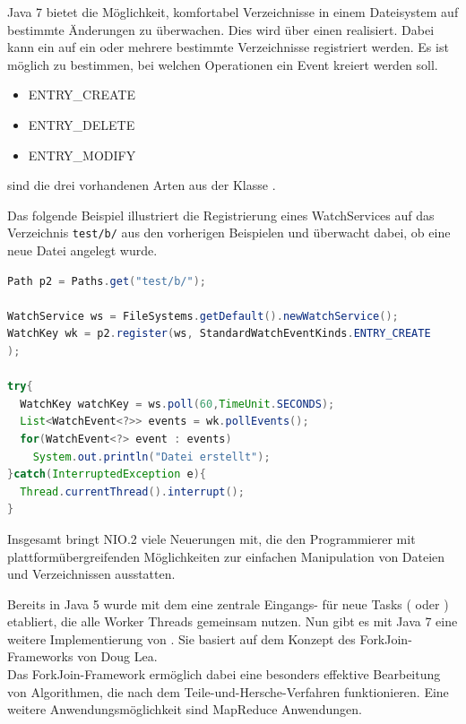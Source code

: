 \documentclass[times, 10pt,twocolumn]{article}
\begin{document}
Java 7 bietet die Möglichkeit, komfortabel Verzeichnisse in einem Dateisystem auf bestimmte Änderungen zu überwachen.
Dies wird über einen  realisiert. Dabei kann ein  auf ein oder mehrere bestimmte Verzeichnisse registriert werden. Es ist möglich zu bestimmen, bei welchen Operationen ein Event kreiert werden soll.
\begin{itemize}
  \item ENTRY\_CREATE
  \item ENTRY\_DELETE
  \item ENTRY\_MODIFY
\end{itemize}
sind die drei vorhandenen Arten aus der Klasse .

Das folgende Beispiel illustriert die Registrierung eines WatchServices auf das Verzeichnis \texttt{test/b/} aus den vorherigen
Beispielen und überwacht dabei, ob eine neue Datei angelegt wurde.
\begin{lstlisting}[language=java,breaklines=true]
Path p2 = Paths.get("test/b/");

WatchService ws = FileSystems.getDefault().newWatchService();
WatchKey wk = p2.register(ws, StandardWatchEventKinds.ENTRY_CREATE
);

try{
  WatchKey watchKey = ws.poll(60,TimeUnit.SECONDS);
  List<WatchEvent<?>> events = wk.pollEvents();
  for(WatchEvent<?> event : events)
    System.out.println("Datei erstellt");
}catch(InterruptedException e){
  Thread.currentThread().interrupt();
}
\end{lstlisting}

Insgesamt bringt NIO.2 viele Neuerungen mit, die den Programmierer mit plattformübergreifenden Möglichkeiten zur einfachen
Manipulation von Dateien und Verzeichnissen ausstatten. 

Bereits in Java 5 wurde mit dem  eine zentrale Eingangs- für neue Tasks ( oder ) etabliert, die alle Worker Threads gemeinsam nutzen. Nun gibt es mit Java 7 eine weitere Implementierung von . Sie basiert auf dem Konzept des ForkJoin-Frameworks\cite{forkjoinpaper} von Doug Lea.\cite{forkjoinheise}\\

Das ForkJoin-Framework ermöglich dabei eine besonders effektive Bearbeitung von Algorithmen, die nach dem Teile-und-Hersche-Verfahren funktionieren. Eine weitere Anwendungsmöglichkeit sind MapReduce Anwendungen.\\
\end{document}
